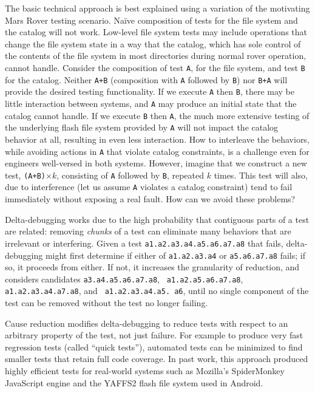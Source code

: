 The basic technical approach is best explained using a variation of the motivating
Mars Rover testing scenario.  Na\"ive composition of tests for the file
system and the catalog will not work.  Low-level file system tests may
include operations that change the file system state in a way that the
catalog, which has sole control of the contents of the file system in
most directories during normal rover operation, cannot handle.
Consider the composition of test {\tt A}, for the file system, and
test {\tt B} for the catalog.  Neither {\tt A+B} (composition with
{\tt A} followed by {\tt B}) nor {\tt B+A} will provide the desired
testing functionality.  If we execute {\tt A} then {\tt B}, there may be little
interaction between systems, and {\tt A} may produce an initial state
that the catalog cannot handle.  If we execute {\tt B} then {\tt A},
the much more extensive testing of the underlying flash file system
provided by {\tt A} will not impact the catalog behavior at all, resulting
in even less interaction.  How to interleave the behaviors, while
avoiding actions in {\tt A} that violate catalog constraints, is a challenge
even for engineers well-versed in both systems.  However, imagine that
we construct a new test, {\tt (A+B)}$\times k$, consisting of {\tt A}
followed by {\tt B}, repeated $k$ times.  This test will also, due to
interference (let us assume {\tt A} violates a catalog constraint) tend to
fail immediately without exposing a real fault. How can we avoid these problems?


Delta-debugging works due to the high probability that contiguous parts
of a test are related: removing \emph{chunks} of a test can
eliminate many behaviors that are irrelevant or interfering.  Given
a test {\tt a1.a2.a3.a4.a5.a6.a7.a8} that fails, delta-debugging 
might first determine if
either of {\tt a1.a2.a3.a4} or {\tt a5.a6.a7.a8} fails; if so, it
proceeds from either.  If not, it increases the granularity of
reduction, and considers candidates {\tt a3.a4.a5.a6.a7.a8}, {\tt
  a1.a2.a5.a6.a7.a8}, {\tt a1.a2.a3.a4.a7.a8}, and {\tt
  a1.a2.a3.a4.a5. a6}, until no single component of the test can be
removed without the test no longer failing.

Cause reduction \cite{icst2014,stvrcausereduce} modifies
delta-debugging to reduce tests with respect to an arbitrary property
of the test, not just failure.  For example to produce very fast
regression tests (called ``quick tests''), automated tests can be
minimized to find smaller tests that retain full code coverage.  In
past work, this approach produced highly efficient tests for
real-world systems such as Mozilla's SpiderMonkey JavaScript engine
and the YAFFS2 flash file system used in Android.

